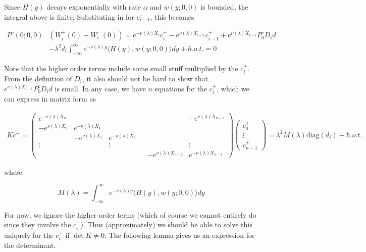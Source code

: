 \documentclass[12pt]{article}
\begin{document}
Since $H(y)$ decays exponentially with rate $\alpha$ and $w(y; 0, 0)$ is bounded, the integral above is finite. Substituting in for $c_{i-1}^-$, this becomes

\begin{align*}
P^c(0; 0, 0)&( W_i^+(0) - W_i^-(0)) = e^{-\nu(\lambda)X_i} c_i^+ - e^{\nu(\lambda)X_{i-1}} c_{i-1}^+ + e^{\nu(\lambda)X_{i-1}} P_0^c D_i d \\
&- \lambda^2 d_i \int_{-\infty}^\infty e^{-\nu(\lambda)y} \langle H(y), w(y; 0, 0) \rangle dy + h.o.t.
= 0
\end{align*}

Note that the higher order terms include some small stuff multiplied by the $c_i^+$. From the definition of $D_i$, it also should not be hard to show that $e^{\nu(\lambda)X_{i-1}} P_0^c D_i d$ is small. In any case, we have $n$ equations for the $c_i^+$, which we can express in matrix form as

\begin{align*}
K c^+ = 
\begin{pmatrix}
e^{-\nu(\lambda)X_0} & & & & & -e^{\nu(\lambda)X_{n-1}} \\
-e^{\nu(\lambda)X_0} & e^{-\nu(\lambda)X_1} \\
& -e^{\nu(\lambda)X_1} & e^{-\nu(\lambda)X_2} \\
\vdots & & \vdots & &&  \vdots \\
& & & & -e^{\nu(\lambda)X_{n-2}} & e^{-\nu(\lambda)X_{n-1}} 
\end{pmatrix}
\begin{pmatrix}
c_0^+ \\ \vdots \\ c_{n-1}^+
\end{pmatrix}
= \lambda^2 M(\lambda) \text{diag}(d_i) + h.o.t.
\end{align*}

where

\[
M(\lambda) = \int_{-\infty}^\infty e^{-\nu(\lambda)y} \langle H(y), w(y; 0, 0) \rangle dy
\]

For now, we ignore the higher order terms (which of course we cannot entirely do since they involve the $c_i^+$). Thus (approximately) we should be able to solve this uniquely for the $c_i^+$ if $\det K \neq 0$. The following lemma gives us an expression for the determinant.
\end{document}
